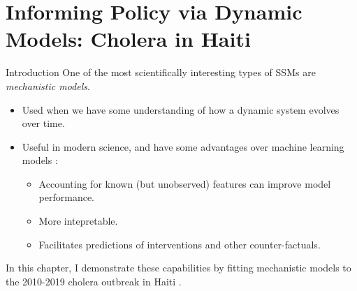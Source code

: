 \documentclass[aspectratio=169]{beamer}\usepackage[]{graphicx}\usepackage[]{xcolor}
\begin{document}
\section{Informing Policy via Dynamic Models: Cholera in Haiti}

\begin{frame}{Introduction}
  One of the most scientifically interesting types of SSMs are \emph{mechanistic models}.
  
  \begin{itemize}
    \item Used when we have some understanding of how a dynamic system evolves over time. 
    \item Useful in modern science, and have some advantages over machine learning models \citep{baker18,hogg24}:
    \begin{itemize}
      \item Accounting for known (but unobserved) features can improve model performance. 
      \item More intepretable. 
      \item Facilitates predictions of interventions and other counter-factuals. 
    \end{itemize}
  \end{itemize}
  \pause
  In this chapter, I demonstrate these capabilities by fitting mechanistic models to the 2010-2019 cholera outbreak in Haiti \citep{wheeler24}. 
\end{frame}
\end{document}

